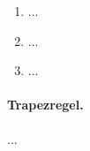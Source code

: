 \documentclass[12pt]{scrreprt}
\begin{document}
\begin{bsp}\label{}
\begin{enumerate}
\item ...
\item ...
\item ...
\end{enumerate}
\end{bsp}

\begin{bsp}\label{}

\end{bsp}

\begin{bsp}\label{}

\end{bsp}

\paragraph{Trapezregel.} ...
\end{document}
